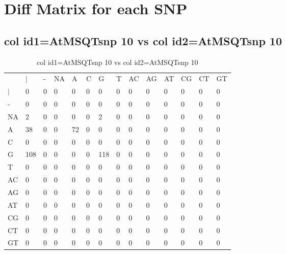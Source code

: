 \section{Diff Matrix for each SNP} \label{section_snp_wise}
\subsection{col id1=AtMSQTsnp 10 vs col id2=AtMSQTsnp 10}
\begin{center}
\begin{longtable}{|l|l|l|l|l|l|l|l|l|l|l|l|l|l|}
\caption{col id1=AtMSQTsnp 10 vs col id2=AtMSQTsnp 10} \label{table_dm682}\\
\hline
\\
\hline
&$|$&-&NA&A&C&G&T&AC&AG&AT&CG&CT&GT\\
$|$&0&0&0&0&0&0&0&0&0&0&0&0&0\\
-&0&0&0&0&0&0&0&0&0&0&0&0&0\\
NA&2&0&0&0&0&2&0&0&0&0&0&0&0\\
A&38&0&0&72&0&0&0&0&0&0&0&0&0\\
C&0&0&0&0&0&0&0&0&0&0&0&0&0\\
G&108&0&0&0&0&118&0&0&0&0&0&0&0\\
T&0&0&0&0&0&0&0&0&0&0&0&0&0\\
AC&0&0&0&0&0&0&0&0&0&0&0&0&0\\
AG&0&0&0&0&0&0&0&0&0&0&0&0&0\\
AT&0&0&0&0&0&0&0&0&0&0&0&0&0\\
CG&0&0&0&0&0&0&0&0&0&0&0&0&0\\
CT&0&0&0&0&0&0&0&0&0&0&0&0&0\\
GT&0&0&0&0&0&0&0&0&0&0&0&0&0\\
\hline
\end{longtable}
\end{center}


